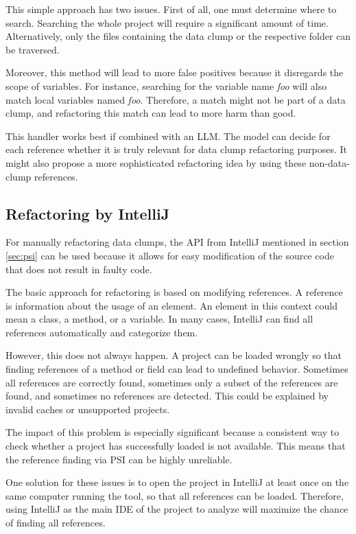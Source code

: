 This simple approach has two issues. First of all, one must determine where to search. Searching the whole project will require a significant amount of time. Alternatively, only the files containing the data clump or the respective folder can be traversed.

Moreover, this method will lead to more false positives because it disregards the scope of variables. For instance, searching for the variable name \textit{foo} will also match local variables named \textit{foo}. Therefore, a match might not be part of a data clump, and refactoring this match can lead to more harm than good. 

This handler works best if combined with an \ac{LLM}. The model can decide for each reference whether it is truly relevant for data clump refactoring purposes. It might also propose a more sophisticated refactoring idea by using these non-data-clump references. 

\subsection{Refactoring by IntelliJ} \label{sec:intellij_refactoring}

For  manually refactoring data clumps, the  \ac{API} from IntelliJ mentioned in section \ref{sec:psi} can be used because it allows for easy modification of the source code that does not result in faulty code. 





The basic approach for refactoring is based on modifying references. A  reference is  information about the usage of an element. An element in this context could mean a class, a method, or a variable.
In many cases, IntelliJ can find all references automatically and categorize them.

However, this does not always happen. A project can be loaded wrongly so that  finding references of a method or field can lead to undefined behavior. Sometimes all references are correctly found, sometimes only a subset of the references are found, and sometimes no references are detected. This could be explained by invalid caches or unsupported projects.

The impact of this problem is especially significant because a consistent way to check  whether a project has successfully loaded is not available. This means that the reference finding via \ac{PSI} can be highly unreliable. 

One solution for these issues is to open the project in IntelliJ at least once  on the same computer running the tool, so that all references can be loaded. Therefore, using IntelliJ as the main \ac{IDE} of the project to analyze will maximize the chance of finding all references.



